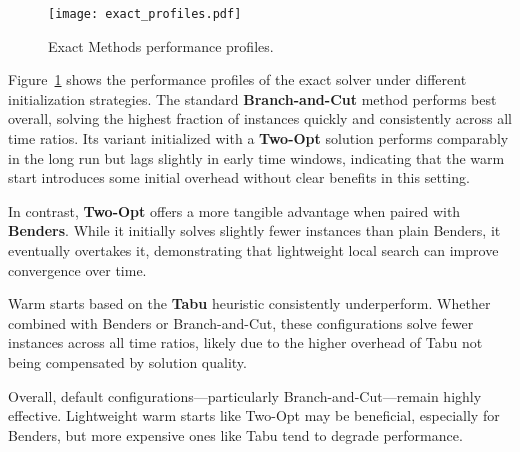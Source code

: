 \begin{figure}[H]
  \centering
  \texttt{[image: exact\_profiles.pdf]}
  \caption{Exact Methods performance profiles.}
  \label{fig:exact}
\end{figure}

Figure~\ref{fig:exact} shows the performance profiles of the exact solver under different initialization strategies. The standard \textbf{Branch-and-Cut} method performs best overall, solving the highest fraction of instances quickly and consistently across all time ratios. Its variant initialized with a \textbf{Two-Opt} solution performs comparably in the long run but lags slightly in early time windows, indicating that the warm start introduces some initial overhead without clear benefits in this setting.

In contrast, \textbf{Two-Opt} offers a more tangible advantage when paired with \textbf{Benders}. While it initially solves slightly fewer instances than plain Benders, it eventually overtakes it, demonstrating that lightweight local search can improve convergence over time.

Warm starts based on the \textbf{Tabu} heuristic consistently underperform. Whether combined with Benders or Branch-and-Cut, these configurations solve fewer instances across all time ratios, likely due to the higher overhead of Tabu not being compensated by solution quality.

Overall, default configurations—particularly Branch-and-Cut—remain highly effective. Lightweight warm starts like Two-Opt may be beneficial, especially for Benders, but more expensive ones like Tabu tend to degrade performance.
